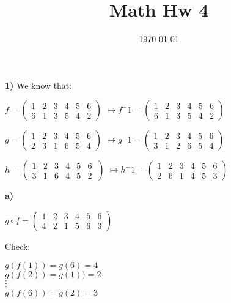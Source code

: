 \documentclass{article}
\title{Math Hw 4}
\date{\today}
\begin{document}
\maketitle

\textbf{1)} 
We know that:





\medskip


$f=(\begin{smallmatrix} 
1 & 2 & 3 & 4 & 5 & 6 \\ 
6 & 1 & 3 & 5 & 4 &2
\end{smallmatrix}) $
				$ \mapsto f^-1=(\begin{smallmatrix} 
				1 & 2 & 3 & 4 & 5 & 6 \\ 
				6 & 1 & 3 & 5 & 4 &2
				\end{smallmatrix}) $ 			

\bigskip
 


$ g=(\begin{smallmatrix} 
1 & 2 & 3 & 4 & 5 & 6 \\									
2 & 3 & 1 & 6 & 5 & 4
\end{smallmatrix}) $
				$ \mapsto g^-1=(\begin{smallmatrix} 
				1 & 2 & 3 & 4 & 5 & 6 \\									
				3 & 1 & 2 & 6 & 5 & 4
				\end{smallmatrix}) $
					
	
\bigskip

	



$h=(\begin{smallmatrix} 
1 & 2 & 3 & 4 & 5 & 6 \\
3 & 1 & 6 & 4 & 5 & 2
\end{smallmatrix}\ )$
					$\mapsto h^-1=(\begin{smallmatrix}
					1 & 2 & 3 & 4 & 5 & 6 \\
					2 & 6 & 1 & 4 & 5 & 3
					\end{smallmatrix})$	

\bigskip

\hspace{.2in}\textbf{a)}

$g  \circ  f=(\begin{smallmatrix}
1 & 2 & 3 & 4 & 5 & 6 \\	
4 & 2 & 1 & 5 & 6 & 3
\end{smallmatrix})$

\medskip
				Check: \begin{center}
				$g(f(1))=g(6)=4 $ \\
				
				$g(f(2))=g(1))=2 $ \\
					 $\cdot$ \\
					$\cdot$ \\
					 $\cdot $\\
				$g(f(6))=g(2)=3 $					
				
				\end{center}
\end{document}
